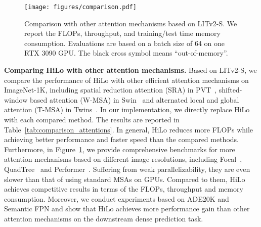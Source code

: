 \begin{figure}[]
	\centering
	\vspace{-2mm}
	\texttt{[image: figures/comparison.pdf]}
	\caption{Comparison with other attention mechanisms based on LITv2-S. We report the FLOPs, throughput, and training/test time memory consumption. Evaluations are based on a batch size of 64 on one RTX 3090 GPU. The black cross symbol means ``out-of-memory''.}
	\label{fig:attn_comparison}
	\vspace{-5mm}
\end{figure}


\textbf{Comparing HiLo with other attention mechanisms.}
Based on LITv2-S, we compare the performance of HiLo with other efficient attention mechanisms on ImageNet-1K, including spatial reduction attention (SRA) in PVT~\cite{pvt}, shifted-window based attention (W-MSA) in Swin~\cite{swin} and alternated local and global attention (T-MSA) in Twins~\cite{chu2021Twins}. In our implementation, we directly replace HiLo with each compared method. The results are reported in Table~\ref{tab:comparison_attentions}. In general, HiLo reduces more FLOPs while achieving better performance and faster speed than the compared methods. Furthermore, in Figure~\ref{fig:attn_comparison}, we provide comprehensive benchmarks for more attention mechanisms based on different image resolutions, including Focal~\cite{yang2021focal}, QuadTree~\cite{tang2022quadtree} and Performer~\cite{performer}. Suffering from weak parallelizability, they are even slower than that of using standard MSAs on GPUs. Compared to them, HiLo achieves competitive results in terms of the FLOPs, throughput and memory consumption. Moreover, we conduct experiments based on ADE20K and Semantic FPN and show that HiLo achieves more performance gain than other attention mechanisms on the downstream dense prediction task.


